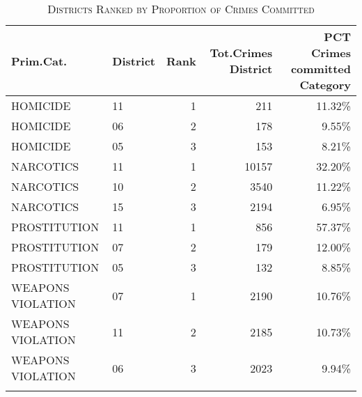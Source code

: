 \documentclass[a4paper]{article}
\begin{document}
\begin{table}[!htbp] \centering 
\begin{adjustwidth}{0cm}{-0cm}
\begin{threeparttable}
\small
\captionsetup{font=small, justification=raggedright,singlelinecheck=false}
\caption{\textsc{Districts Ranked by Proportion of Crimes Committed}}
\centering 
  \label{}
\small 
\begin{tabular}{@{\extracolsep{8pt}}llrrr} 
\\[-5.8ex]\hline 

\toprule
  Prim.Cat. & District &  Rank &  Tot.Crimes District &  PCT Crimes committed Category\\
\midrule
         HOMICIDE &       11 &                     1 &                          211 &                   11.32\% \\
         HOMICIDE &       06 &                     2 &                          178 &                    9.55\% \\
         HOMICIDE &       05 &                     3 &                          153 &                    8.21\% \\
        NARCOTICS &       11 &                     1 &                        10157 &                   32.20\% \\
        NARCOTICS &       10 &                     2 &                         3540 &                   11.22\% \\
        NARCOTICS &       15 &                     3 &                         2194 &                    6.95\% \\
     PROSTITUTION &       11 &                     1 &                          856 &                   57.37\% \\
     PROSTITUTION &       07 &                     2 &                          179 &                   12.00\% \\
     PROSTITUTION &       05 &                     3 &                          132 &                    8.85\% \\
WEAPONS VIOLATION &       07 &                     1 &                         2190 &                   10.76\% \\
WEAPONS VIOLATION &       11 &                     2 &                         2185 &                   10.73\% \\
WEAPONS VIOLATION &       06 &                     3 &                         2023 &                    9.94\% \\
\bottomrule
\hline \\[-3.5ex] 
\end{tabular} 
\begin{tablenotes}
      \small
      \item\textit{ }
    \end{tablenotes}
\end{threeparttable}
\end{adjustwidth}
%
\end{table}
\end{document}
